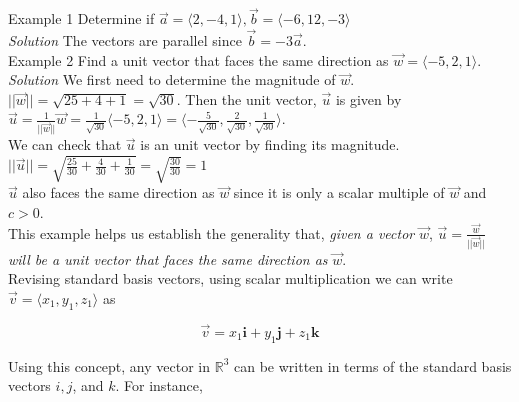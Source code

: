         \noindent \color{blue} Example 1 \color{black} Determine if
        $\overrightarrow{a} = \langle 2,-4,1\rangle, \overrightarrow{b}=\langle -6,12,-3\rangle$ \\
        \emph{Solution} The vectors are parallel since $\overrightarrow{b}=-3\overrightarrow{a}$. \\

        \noindent \color{blue} Example 2 \color{black} Find a unit vector that faces the same
        direction as $\overrightarrow{w}=\langle-5,2,1\rangle.$\\
        \emph{Solution} We first need to determine the magnitude of $\overrightarrow{w}$.\\
        $||\overrightarrow{w}||=\sqrt{25+4+1}=\sqrt{30}$.
        Then the unit vector, $\overrightarrow{u}$ is given by\\
        $\overrightarrow{u}=\frac{1}{||\overrightarrow{w}||}\overrightarrow{w}
        =\frac{1}{\sqrt{30}}\langle-5,2,1\rangle=\langle-\frac{5}{\sqrt{30}},
        \frac{2}{\sqrt{30}},\frac{1}{\sqrt{30}}\rangle$.\\
        We can check that $\overrightarrow{u}$ is an unit vector by finding its magnitude.\\
        $||\overrightarrow{u}||=\sqrt{\frac{25}{30}+\frac{4}{30}+\frac{1}{30}}=\sqrt{\frac{30}{30}}=1$\\
        $\overrightarrow{u}$ also faces the same direction as $\overrightarrow{w}$ since it is
        only a scalar multiple of $\overrightarrow{w}$ and $c > 0$.\\

        \noindent This example helps us establish the generality that, \emph{given a vector}
        $\overrightarrow{w}$, $\overrightarrow{u}=\frac{\overrightarrow{w}}{||\overrightarrow{w}||}$
        \emph{will be a unit vector that faces the same direction as} $\overrightarrow{w}$.\\

        \noindent Revising standard basis vectors, using scalar multiplication we can write
        $\overrightarrow{v}=\langle x_1,y_1,z_1\rangle$ as

        \begin{equation*}
            \overrightarrow{v}=x_1\textbf{i}+y_1\textbf{j}+z_1\textbf{k}
        \end{equation*}

        \noindent Using this concept, any vector in $\mathbb{R}^3$ can be written in terms of the
        standard basis vectors $i, j$, and $k$. For instance,

